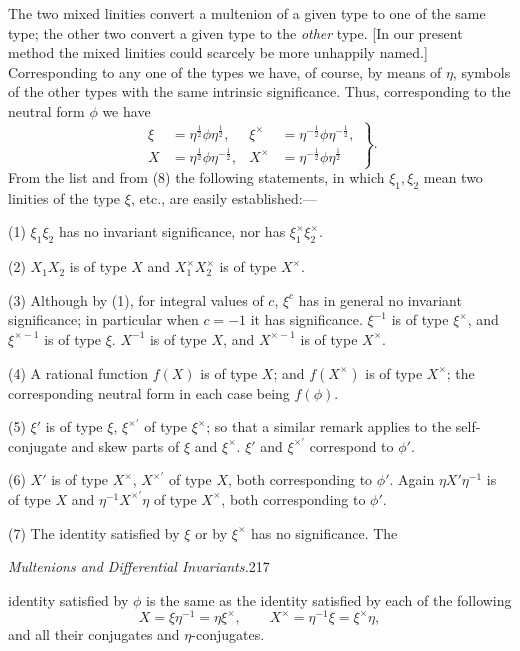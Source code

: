 \documentclass[11pt]{article}
\begin{document}
\indent The two mixed linities convert a multenion of a given type to one of the same type; the other two convert a given type to the \emph{other} type. [In our present method the mixed linities could scarcely be more unhappily named.]
\indent Corresponding to any one of the types we have, of course, by means of $\eta$, symbols of the other types with the same intrinsic significance. Thus, corresponding to the neutral form $\phi$ we have
\begin{equation}\left.\begin{aligned}\xi&=\eta^{\frac12}\phi\eta^{\frac12},&\xi^\times&=\eta^{-\frac12}\phi\eta^{-\frac12},\\X&=\eta^{\frac12}\phi\eta^{-\frac12},&X^\times&=\eta^{-\frac12}\phi\eta^{\frac12}\end{aligned}\right\}.\tag{8}\end{equation}
From the list and from (8) the following statements, in which $\xi_1,\xi_2$ mean two linities of the type $\xi$, etc., are easily established:---
\par\indent (1) $\xi_1\xi_2$ has no invariant significance, nor has $\xi_1^\times\xi_2^\times$.
\par\indent (2) $X_1X_2$ is of type $X$ and $X_1^\times X_2^\times$ is of type $X^\times$.
\par\indent (3) Although by (1), for integral values of $c$, $\xi^c$ has in general no invariant significance; in particular when $c=-1$ it has significance. $\xi^{-1}$ is of type $\xi^\times$, and $\xi^{\times-1}$ is of type $\xi$. $X^{-1}$ is of type $X$, and $X^{\times-1}$ is of type $X^\times$.
\par\indent (4) A rational function $f(X)$ is of type $X$; and $f(X^\times)$ is of type $X^\times$; the corresponding neutral form in each case being $f(\phi)$.
\par\indent (5) $\xi'$ is of type $\xi$, $\xi^{\times\prime}$ of type $\xi^\times$; so that a similar remark applies to the self-conjugate and skew parts of $\xi$ and $\xi^\times$. $\xi'$ and $\xi^{\times\prime}$ correspond to $\phi'$.
\par\indent (6) $X'$ is of type $X^\times$, $X^{\times\prime}$ of type $X$, both corresponding to $\phi'$. Again $\eta X'\eta^{-1}$ is of type $X$ and $\eta^{-1}X^{\times\prime}\eta$ of type $X^\times$, both corresponding to $\phi'$.
\par\indent (7) The identity satisfied by $\xi$ or by $\xi^\times$ has no significance. The
\newpage\thispagestyle{empty}\begin{center}\textit{Multenions and Differential Invariants.}\hfill 217\end{center}
identity satisfied by $\phi$ is the same as the identity satisfied by each of the following
\[
X=\xi\eta^{-1}=\eta\xi^\times,\qquad X^\times=\eta^{-1}\xi=\xi^\times\eta,
\]
and all their conjugates and $\eta$-conjugates.
\end{document}

